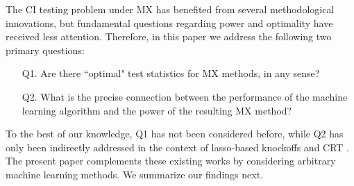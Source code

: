 \documentclass[12pt]{article}
\theoremstyle{definition}
\theoremstyle{remark}
\newcommand{\prx}{\bm X}
\newcommand{\srx}{X}
\newcommand{\prz}{\bm Z}
\newcommand{\srz}{Z}
\newcommand{\srxk}{\widetilde X}
\newcommand{\pry}{{\bm Y}}
\newcommand{\sry}{Y}
\begin{document}
The CI testing problem under MX has benefited from several methodological innovations, but fundamental questions regarding power and optimality have received less attention. Therefore, in this paper we address the following two primary questions:
\begin{enumerate}
	\item[Q1.] Are there ``optimal" test statistics for MX methods, in any sense?
	\item[Q2.] What is the precise connection between the performance of the machine learning algorithm and the power of the resulting MX method?
\end{enumerate}
To the best of our knowledge, Q1 has not been considered before, while Q2 has only been indirectly addressed in the context of lasso-based knockoffs \cite{Weinstein2017, Liu2019, Fan2020, Weinstein2020} and CRT \cite{Wang2020b, Celentano2020}. The present paper complements these existing works by considering arbitrary machine learning methods. We summarize our findings next.


\end{document}

